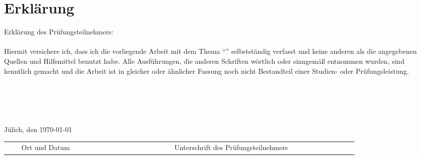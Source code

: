 \chapter{Erklärung}
Erklärung des Prüfungsteilnehmers:
\\
\\
Hiermit versichere ich, dass ich die vorliegende Arbeit mit dem Thema ``\ArbeitThema'' selbstständig verfasst und keine anderen als die angegebenen Quellen und Hilfsmittel benutzt habe. Alle Ausführungen, die anderen Schriften wörtlich oder sinngemäß entnommen wurden, sind kenntlich gemacht und die Arbeit ist in gleicher oder ähnlicher Fassung noch nicht Bestandteil einer Studien- oder Prüfungsleistung.
\\
\\
\\
\\
\\
\\\small{Jülich, den \today}\\
\begin{tabular}{r r r r r r r r r r r r r r r r r r r r r r r r r r r}
\cline{1-5} \cline{12-25}\\[-0.3cm]
& &\tiny{Ort und Datum}& & & & & & & & & & & & & & &\tiny{Unterschrift des Prüfungsteilnehmers}& & & & & & &\\
\end{tabular}
\cleardoublepage